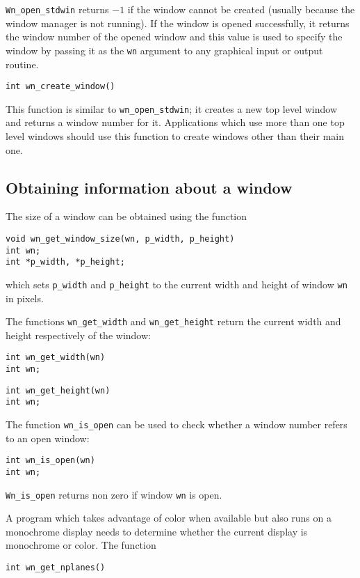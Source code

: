 {\tt Wn\_open\_stdwin} returns $-1$ if the window cannot be created (usually
because the window manager is not running).
If the window is opened successfully, it returns the window number of
the opened window and this value is used to specify the window by passing it as the
{\tt wn} argument to
any graphical input or output routine.

\begin{verbatim}
int wn_create_window()
\end{verbatim}
This function is similar to {\tt wn\_open\_stdwin}; it creates a new
top level window and returns a window number for it.
Applications which use more than one top level windows should use this
function to create windows other than their main one.
\subsection{Obtaining information about a window}
The size of a window can be obtained using the function
\begin{verbatim}
void wn_get_window_size(wn, p_width, p_height)
int wn;
int *p_width, *p_height;
\end{verbatim}
which sets {\tt *p\_width} and {\tt *p\_height} to the current width
and height of window {\tt wn} in pixels.

The functions {\tt wn\_get\_width} and {\tt wn\_get\_height} return the
current width and height respectively of the window:
\begin{verbatim}
int wn_get_width(wn)
int wn;
\end{verbatim}
\begin{verbatim}
int wn_get_height(wn)
int wn;
\end{verbatim}

The function {\tt wn\_is\_open} can be used to check whether a window
number refers to an open window:
\begin{verbatim}
int wn_is_open(wn)
int wn;
\end{verbatim}
{\tt Wn\_is\_open} returns non zero if window {\tt wn} is open.

A program which takes advantage of color when available but also
runs on a monochrome display needs to determine whether the
current display is monochrome or color. The function
\begin{verbatim}
int wn_get_nplanes()
\end{verbatim}

